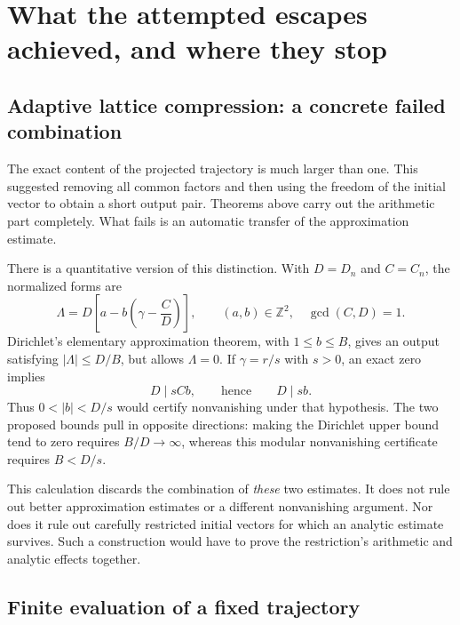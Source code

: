 \documentclass[11pt,a4paper]{article}
\theoremstyle{definition}
\theoremstyle{remark}
\newcommand{\Z}{\mathbb Z}
\numberwithin{equation}{section}
\begin{document}
\section{What the attempted escapes achieved, and where they stop}
\label{p7:sec:assessment}

\subsection{Adaptive lattice compression: a concrete failed combination}

The exact content of the projected trajectory is much larger than one.
This suggested removing all common factors and then using the freedom
of the initial vector to obtain a short output pair. Theorems above
carry out the arithmetic part completely. What fails is an automatic
transfer of the approximation estimate.

There is a quantitative version of this distinction. With
$D=D_n$ and $C=C_n$, the normalized forms are
\[
 \Lambda=D\left[a-b\left(\gamma-\frac CD\right)\right],
 \qquad (a,b)\in\Z^2,\quad \gcd(C,D)=1.
\]
Dirichlet's elementary approximation theorem, with $1\le b\le B$,
gives an output satisfying $|\Lambda|\le D/B$, but allows $\Lambda=0$.
If $\gamma=r/s$ with $s>0$, an exact zero implies
\[
 D\mid sCb,\qquad\text{hence}\qquad D\mid sb.
\]
Thus $0<|b|<D/s$ would certify nonvanishing under that hypothesis.
The two proposed bounds pull in opposite directions: making the
Dirichlet upper bound tend to zero requires $B/D\to\infty$, whereas
this modular nonvanishing certificate requires $B<D/s$.

This calculation discards the combination of \emph{these} two estimates.
It does not rule out better approximation estimates or a different
nonvanishing argument. Nor does it rule out carefully restricted initial
vectors for which an analytic estimate survives. Such a construction
would have to prove the restriction's arithmetic and analytic effects
together.

\subsection{Finite evaluation of a fixed trajectory}
\end{document}
